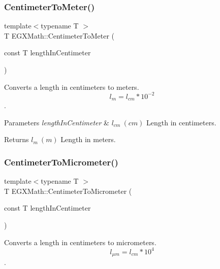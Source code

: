 \subsubsection{\texorpdfstring{Centimeter\+To\+Meter()}{CentimeterToMeter()}}
{\footnotesize\ttfamily template$<$typename T $>$ \\
T E\+G\+X\+Math\+::\+Centimeter\+To\+Meter (\begin{DoxyParamCaption}\item[{const T}]{length\+In\+Centimeter }\end{DoxyParamCaption})}



Converts a length in centimeters to meters. \[ l_{m}=l_{cm} * 10^{-2} \]. 


\begin{DoxyParams}{Parameters}
{\em length\+In\+Centimeter} & $ l_{cm}\ (cm)$ Length in centimeters. \\
\hline
\end{DoxyParams}
\begin{DoxyReturn}{Returns}
$ l_{m}\ (m)$ Length in meters. 
\end{DoxyReturn}
\mbox{\label{group___e_g_x_math-_conversions-_length_conversions-_s_i-_centimeter-_s_i_gaa05fd2c1b2c9ab2ac8aa7f1ef8be612a}} 
\subsubsection{\texorpdfstring{Centimeter\+To\+Micrometer()}{CentimeterToMicrometer()}}
{\footnotesize\ttfamily template$<$typename T $>$ \\
T E\+G\+X\+Math\+::\+Centimeter\+To\+Micrometer (\begin{DoxyParamCaption}\item[{const T}]{length\+In\+Centimeter }\end{DoxyParamCaption})}



Converts a length in centimeters to micrometers. \[ l_{\mu m}=l_{cm} * 10^{4} \]. 

